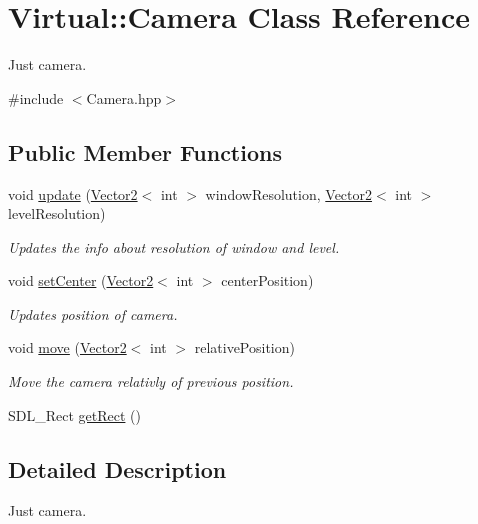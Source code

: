 \hypertarget{class_virtual_1_1_camera}{}\section{Virtual\+:\+:Camera Class Reference}
\label{class_virtual_1_1_camera}


Just camera.  




{\ttfamily \#include $<$Camera.\+hpp$>$}

\subsection*{Public Member Functions}
\begin{DoxyCompactItemize}
\item 
void \hyperlink{class_virtual_1_1_camera_a6916239ab1b8ad4a9b1c20c36f28de18}{update} (\hyperlink{struct_virtual_1_1_vector2}{Vector2}$<$ int $>$ window\+Resolution, \hyperlink{struct_virtual_1_1_vector2}{Vector2}$<$ int $>$ level\+Resolution)
\begin{DoxyCompactList}\small\item\em Updates the info about resolution of window and level. \end{DoxyCompactList}\item 
void \hyperlink{class_virtual_1_1_camera_ae6c71fea6b4f46be3af9c015507576a0}{set\+Center} (\hyperlink{struct_virtual_1_1_vector2}{Vector2}$<$ int $>$ center\+Position)
\begin{DoxyCompactList}\small\item\em Updates position of camera. \end{DoxyCompactList}\item 
void \hyperlink{class_virtual_1_1_camera_ac6ec60ab0905c4ddcaa835914d20f770}{move} (\hyperlink{struct_virtual_1_1_vector2}{Vector2}$<$ int $>$ relative\+Position)
\begin{DoxyCompactList}\small\item\em Move the camera relativly of previous position. \end{DoxyCompactList}\item 
S\+D\+L\+\_\+\+Rect \hyperlink{class_virtual_1_1_camera_a45d86b427fa74b7c0bf2febe1d20cb01}{get\+Rect} ()
\end{DoxyCompactItemize}


\subsection{Detailed Description}
Just camera. 

